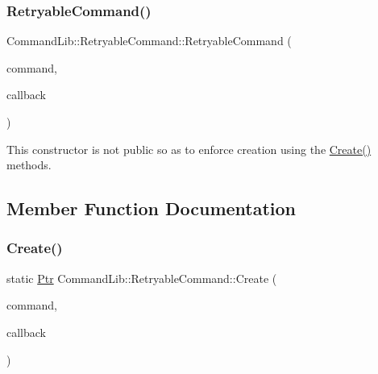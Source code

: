 \subsubsection{\texorpdfstring{Retryable\+Command()}{RetryableCommand()}}
{\footnotesize\ttfamily Command\+Lib\+::\+Retryable\+Command\+::\+Retryable\+Command (\begin{DoxyParamCaption}\item[{\mbox{\hyperlink{class_command_lib_1_1_command_a3b3e4f00144373299df5c6bb1acc319d}{Command\+::\+Ptr}}}]{command,  }\item[{\mbox{\hyperlink{class_command_lib_1_1_retryable_command_1_1_retry_callback}{Retry\+Callback}} $\ast$}]{callback }\end{DoxyParamCaption})\hspace{0.3cm}{\ttfamily [protected]}}



This constructor is not public so as to enforce creation using the \mbox{\hyperlink{class_command_lib_1_1_retryable_command_ae37523bf0a28f0a3ad8953a59cc1a128}{Create()}} methods. 



\subsection{Member Function Documentation}
\mbox{\label{class_command_lib_1_1_retryable_command_ae37523bf0a28f0a3ad8953a59cc1a128}} 
\subsubsection{\texorpdfstring{Create()}{Create()}}
{\footnotesize\ttfamily static \mbox{\hyperlink{class_command_lib_1_1_command_a3b3e4f00144373299df5c6bb1acc319d}{Ptr}} Command\+Lib\+::\+Retryable\+Command\+::\+Create (\begin{DoxyParamCaption}\item[{\mbox{\hyperlink{class_command_lib_1_1_command_a3b3e4f00144373299df5c6bb1acc319d}{Command\+::\+Ptr}}}]{command,  }\item[{\mbox{\hyperlink{class_command_lib_1_1_retryable_command_1_1_retry_callback}{Retry\+Callback}} $\ast$}]{callback }\end{DoxyParamCaption})\hspace{0.3cm}{\ttfamily [static]}}



